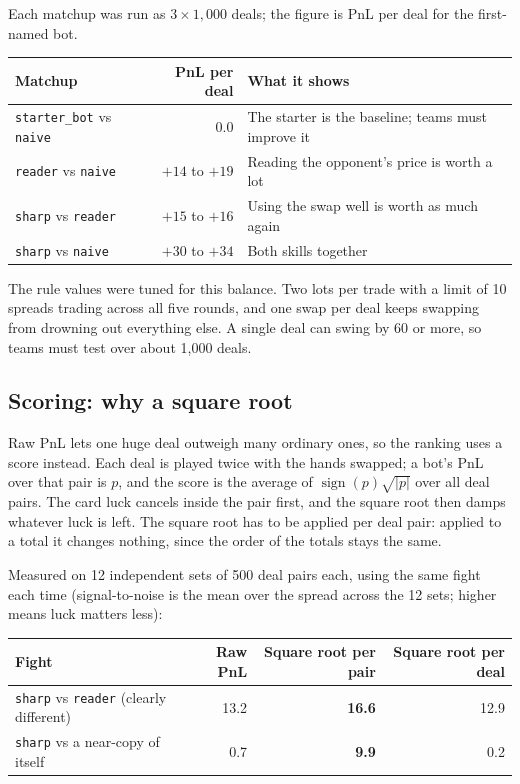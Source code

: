 \documentclass[11pt,a4paper]{article}
\newcommand{\code}[1]{\texttt{#1}}
\begin{document}
Each matchup was run as $3 \times 1{,}000$ deals; the figure is PnL per deal for the
first-named bot.

\begin{center}
\begin{tabularx}{\linewidth}{@{}l r L@{}}
\toprule
\textbf{Matchup} & \textbf{PnL per deal} & \textbf{What it shows} \\
\midrule
\code{starter\_bot} vs \code{naive} & $0.0$ & The starter is the baseline; teams must improve it \\
\code{reader} vs \code{naive}       & $+14$ to $+19$ & Reading the opponent's price is worth a lot \\
\code{sharp} vs \code{reader}       & $+15$ to $+16$ & Using the swap well is worth as much again \\
\code{sharp} vs \code{naive}        & $+30$ to $+34$ & Both skills together \\
\bottomrule
\end{tabularx}
\end{center}

The rule values were tuned for this balance. Two lots per trade with a limit of 10 spreads
trading across all five rounds, and one swap per deal keeps swapping from drowning out
everything else. A single deal can swing by 60 or more, so teams must test over about 1,000
deals.

\subsection{Scoring: why a square root}

Raw PnL lets one huge deal outweigh many ordinary ones, so the ranking uses a score instead.
Each deal is played twice with the hands swapped; a bot's PnL over that pair is $p$, and the
score is the average of $\operatorname{sign}(p)\sqrt{|p|}$ over all deal pairs. The card luck
cancels inside the pair first, and the square root then damps whatever luck is left. The square
root has to be applied per deal pair: applied to a total it changes nothing, since the order of
the totals stays the same.

Measured on 12 independent sets of 500 deal pairs each, using the same fight each time
(signal-to-noise is the mean over the spread across the 12 sets; higher means luck matters less):

\begin{center}
\begin{tabularx}{\linewidth}{@{}L r r r@{}}
\toprule
\textbf{Fight} & \textbf{Raw PnL} & \textbf{Square root per pair} & \textbf{Square root per deal} \\
\midrule
\code{sharp} vs \code{reader} (clearly different) & 13.2 & \textbf{16.6} & 12.9 \\
\code{sharp} vs a near-copy of itself & 0.7 & \textbf{9.9} & 0.2 \\
\bottomrule
\end{tabularx}
\end{center}
\end{document}

